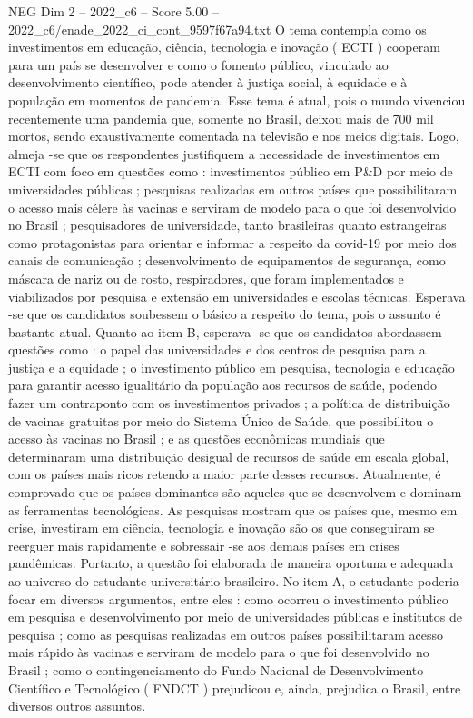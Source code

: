 \begin{textsample}{NEG Dim 2 – 2022\_c6 – Score 5.00 – 2022\_c6/enade\_2022\_ci\_cont\_9597f67a94.txt}
O tema contempla como os investimentos em educação, ciência, tecnologia e inovação ( ECTI ) cooperam para um país se desenvolver e como o fomento público, vinculado ao desenvolvimento científico, pode atender à justiça social, à equidade e à população em momentos de pandemia.
Esse tema é atual, pois o mundo vivenciou recentemente uma pandemia que, somente no Brasil, deixou mais de 700 mil mortos, sendo exaustivamente comentada na televisão e nos meios digitais.
Logo, almeja -se que os respondentes justifiquem a necessidade de investimentos em ECTI com foco em questões como : investimentos público em P\&D por meio de universidades públicas ; pesquisas realizadas em outros países que possibilitaram o acesso mais célere às vacinas e serviram de modelo para o que foi desenvolvido no Brasil ; pesquisadores de universidade, tanto brasileiras quanto estrangeiras como protagonistas para orientar e informar a respeito da covid-19 por meio dos canais de comunicação ; desenvolvimento de equipamentos de segurança, como máscara de nariz ou de rosto, respiradores, que foram implementados e viabilizados por pesquisa e extensão em universidades e escolas técnicas.
Esperava -se que os candidatos soubessem o básico a respeito do tema, pois o assunto é bastante atual.
Quanto ao item B, esperava -se que os candidatos abordassem questões como : o papel das universidades e dos centros de pesquisa para a justiça e a equidade ; o investimento público em pesquisa, tecnologia e educação para garantir acesso igualitário da população aos recursos de saúde, podendo fazer um contraponto com os investimentos privados ; a política de distribuição de vacinas gratuitas por meio do Sistema Único de Saúde, que possibilitou o acesso às vacinas no Brasil ; e as questões econômicas mundiais que determinaram uma distribuição desigual de recursos de saúde em escala global, com os países mais ricos retendo a maior parte desses recursos.
Atualmente, é comprovado que os países dominantes são aqueles que se desenvolvem e dominam as ferramentas tecnológicas.
As pesquisas mostram que os países que, mesmo em crise, investiram em ciência, tecnologia e inovação são os que conseguiram se reerguer mais rapidamente e sobressair -se aos demais países em crises pandêmicas.
Portanto, a questão foi elaborada de maneira oportuna e adequada ao universo do estudante universitário brasileiro.
No item A, o estudante poderia focar em diversos argumentos, entre eles : como ocorreu o investimento público em pesquisa e desenvolvimento por meio de universidades públicas e institutos de pesquisa ; como as pesquisas realizadas em outros países possibilitaram acesso mais rápido às vacinas e serviram de modelo para o que foi desenvolvido no Brasil ; como o contingenciamento do Fundo Nacional de Desenvolvimento Científico e Tecnológico ( FNDCT ) prejudicou e, ainda, prejudica o Brasil, entre diversos outros assuntos.

\end{textsample}
